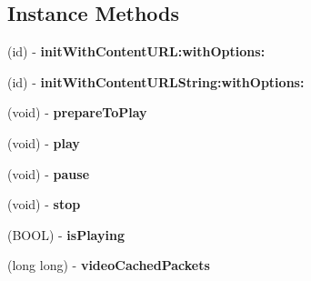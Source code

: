 \subsection*{Instance Methods}
\begin{DoxyCompactItemize}
\item 
\mbox{\label{interface_i_j_k_f_f_movie_player_controller_a43d3d3535b52972efab31668c6a31665}} 
(id) -\/ {\bfseries init\+With\+Content\+U\+R\+L\+:with\+Options\+:}
\item 
\mbox{\label{interface_i_j_k_f_f_movie_player_controller_adead79aff8603127db86dfdc7c4dc720}} 
(id) -\/ {\bfseries init\+With\+Content\+U\+R\+L\+String\+:with\+Options\+:}
\item 
\mbox{\label{interface_i_j_k_f_f_movie_player_controller_aa913d429f90ea15adf9a1bb686a69d54}} 
(void) -\/ {\bfseries prepare\+To\+Play}
\item 
\mbox{\label{interface_i_j_k_f_f_movie_player_controller_ac72fd52394a2e0309d86fc4711870d30}} 
(void) -\/ {\bfseries play}
\item 
\mbox{\label{interface_i_j_k_f_f_movie_player_controller_a2ff0f424c205d12bd66d0647e05aa545}} 
(void) -\/ {\bfseries pause}
\item 
\mbox{\label{interface_i_j_k_f_f_movie_player_controller_ace2b1458a9925420ddd3b06352b087c7}} 
(void) -\/ {\bfseries stop}
\item 
\mbox{\label{interface_i_j_k_f_f_movie_player_controller_a81beb8077edb03f86b27031bbc25dc37}} 
(B\+O\+OL) -\/ {\bfseries is\+Playing}
\item 
\mbox{\label{interface_i_j_k_f_f_movie_player_controller_a0078cdb6c28e907f9f72b56300f813cd}} 
(long long) -\/ {\bfseries video\+Cached\+Packets}
\item 
\mbox{\label{interface_i_j_k_f_f_movie_player_controller_a22a9e7c065a2ac8a00082216d1c44495}} 

\end{DoxyCompactItemize}
